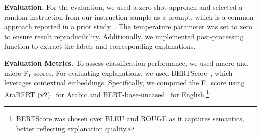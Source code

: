 \noindent
\textbf{Evaluation.} For the evaluation, we used a zero-shot approach and selected a random instruction from our instruction sample as a prompt, which is a common approach reported in a prior study~\cite{kmainasi2024llamalensspecializedmultilingualllm}. The temperature parameter was set to zero to ensure result reproducibility. Additionally, we implemented post-processing function to extract the labels and corresponding explanations.

\noindent
\textbf{Evaluation Metrics.} To assess classification performance, we used macro and micro F$_1$ scores. For evaluating explanations, we used BERTScore~\cite{zhang2020bertscoreevaluatingtextgeneration}, which leverages contextual embeddings. Specifically, we computed the F$_1$ score using AraBERT (v2)~\cite{antoun-etal-2020-arabert} for Arabic and BERT-base-uncased~\cite{devlin2019bert} for English.\footnote{BERTScore was chosen over BLEU and ROUGE as it captures semantics, better reflecting explanation quality.}





